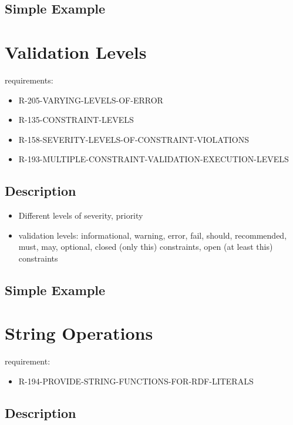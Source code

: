 \documentclass{llncs}
\begin{document}
\subsection{Simple Example}



\section{Validation Levels}

requirements:

\begin{itemize}
	\item R-205-VARYING-LEVELS-OF-ERROR
	\item R-135-CONSTRAINT-LEVELS
	\item R-158-SEVERITY-LEVELS-OF-CONSTRAINT-VIOLATIONS
	\item R-193-MULTIPLE-CONSTRAINT-VALIDATION-EXECUTION-LEVELS
\end{itemize}

\subsection{Description}

\begin{itemize}
  \item Different levels of severity, priority
	\item validation levels: informational, warning, error, fail, should, recommended, must, may, optional, closed (only this) constraints, open (at least this) constraints
\end{itemize}

\subsection{Simple Example}



\section{String Operations}

requirement:

\begin{itemize}
	\item R-194-PROVIDE-STRING-FUNCTIONS-FOR-RDF-LITERALS
\end{itemize}

\subsection{Description}
\end{document}
